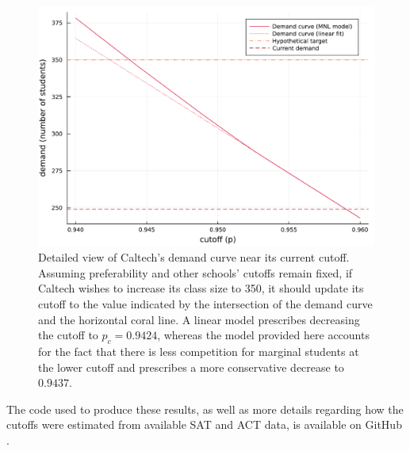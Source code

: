 \documentclass[12pt]{article}
\theoremstyle{definition}
\begin{document}
\begin{figure}
\begin{center}\includegraphics[width=\linewidth, ]{plots/caltech-demand-curve.pdf}\end{center}
\captionsetup{singlelinecheck=off}
    \caption[.]{Detailed view of Caltech's demand curve near its current cutoff. Assuming preferability and other schools' cutoffs remain fixed, if Caltech wishes to increase its class size to 350, it should update its cutoff to the value indicated by the intersection of the demand curve and the horizontal coral line. A linear model prescribes decreasing the cutoff to $p_c = 0.9424$, whereas the model provided here accounts for the fact that there is less competition for marginal students at the lower cutoff and prescribes a more conservative decrease to $0.9437$. }
\label{caltech-demand-curve}
\end{figure}








The code used to produce these results, as well as more details regarding how the cutoffs were estimated from available SAT and ACT data, is available on GitHub \parencite[][]{studentprefsrevopt}.
\end{document}
